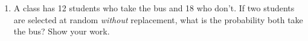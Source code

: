 \documentclass[10pt]{article}
\begin{document}
\begin{enumerate}
    \vspace{6pt}
    \begin{enumerate}[label=(\alph*), itemsep=8pt]
        \item If a student is chosen at random, find $P(\text{studied and passed})$.
              \quad \blank{3cm}
        \item Find $P(\text{passed} \mid \text{studied})$. \quad \blank{3cm}
    \end{enumerate}

    \vspace{0.14in}

    \item A class has 12 students who take the bus and 18 who don't. If two students
          are selected at random \emph{without} replacement, what is the probability
          both take the bus? Show your work.\\[4pt]
          \writeline\\[1pt]\writeline

\end{enumerate}
\end{document}
